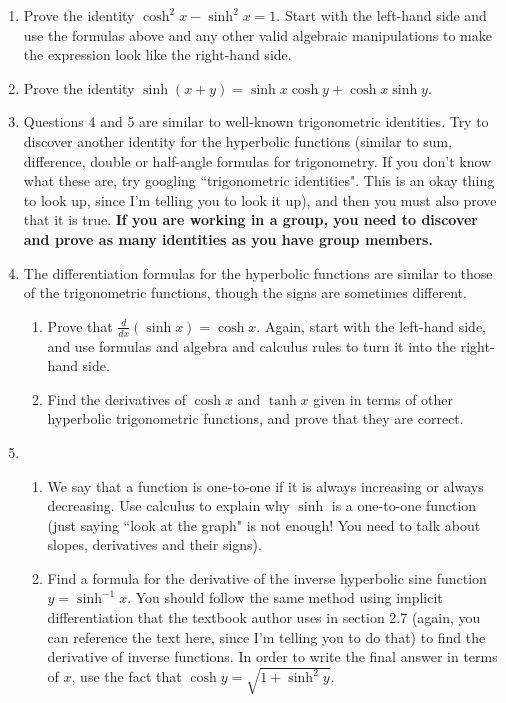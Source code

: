 \documentclass[12pt]{amsart}
\newcommand{\ds}{\displaystyle}
\begin{document}
\begin{enumerate}
\begin{enumerate}
You need to give a similar justification for $\cosh$, $\sinh$ and $\tanh$.
\end{enumerate}
\bigskip
\item  Prove the identity $\cosh^2x - \sinh^2x = 1$.  Start with the left-hand side and use the formulas above and any other valid algebraic manipulations to make the expression look like the right-hand side.
\bigskip
\item  Prove the identity $\sinh(x + y) = \sinh x \cosh y + \cosh x \sinh y$.
\bigskip
\item  Questions 4 and 5 are similar to well-known trigonometric identities. Try to discover another identity for the hyperbolic functions (similar to sum, difference, double or half-angle formulas for trigonometry. If you don't know what these are, try googling ``trigonometric identities". This is an okay thing to look up, since I'm telling you to look it up), and then you must also prove that it is true. {\bf If you are working in a group, you need to discover and prove as many identities as you have group members.}
\bigskip
\item  The differentiation formulas for the hyperbolic functions are similar to those of the trigonometric functions, though the signs are sometimes different.
\begin{enumerate}
\item  Prove that $\ds{\frac{d}{dx}\left(\sinh x\right) = \cosh x}$.  Again, start with the left-hand side, and use formulas and algebra and calculus rules to turn it into the right-hand side.
\smallskip
\item  Find the derivatives of $\cosh x$ and $\tanh x$ given in terms of other hyperbolic trigonometric functions, and prove that they are correct.
\end{enumerate}
\bigskip
\item ~
\begin{enumerate}
\item  We say that a function is one-to-one if it is always increasing or always decreasing. Use calculus to explain why $\sinh$ is a one-to-one function (just saying ``look at the graph" is not enough! You need to talk about slopes, derivatives and their signs).
\item  Find a formula for the derivative of the inverse hyperbolic sine function $y = \sinh^{-1}x$.  You should follow the same method using implicit differentiation that the textbook author uses in section 2.7 (again, you can reference the text here, since I'm telling you to do that) to find the derivative of inverse functions. In order to write the final answer in terms of $x$, use the fact that $\cosh y = \sqrt{1 + \sinh^2y}$.

\end{enumerate}
\end{enumerate}
\end{document}
